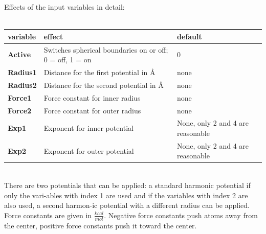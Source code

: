 \documentclass[10pt,a4paper]{article} %
\begin{document}
	Effects of the input variables in detail:\\~\\
	\begin{tabularx}{\textwidth}{l|X|X}
		\textbf{variable} & effect & default \\
		\hline
		\textbf{Active} & Switches spherical boundaries on or off; 0 = off, 1 = on & 0 \\
		\textbf{Radius1} & Distance for the first potential in Å & none \\
		\textbf{Radius2} & Distance for the second potential in Å & none \\
		\textbf{Force1} & Force constant for inner radius & none \\
		\textbf{Force2} & Force constant for outer radius & none \\
		\textbf{Exp1} & Exponent for inner potential & None, only 2 and 4 are reasonable \\
		\textbf{Exp2} & Exponent for outer potential & None, only 2 and 4 are reasonable \\
	\end{tabularx}~\\
	There are two potentials that can be applied: a standard harmonic potential if only the vari-ables with index 1 are used and if the variables with index 2 are also used, a second harmon-ic potential with a different radius can be applied.
	Force constants are given in $\frac{kcal}{mol}$. Negative force constants push atoms away from the center, positive force constants push it toward the center.
\end{document}
